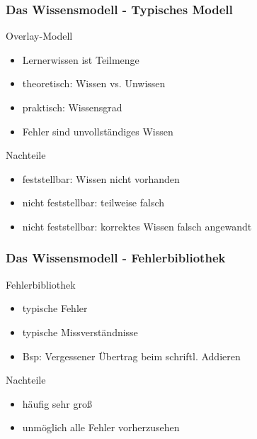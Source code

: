 \documentclass{beamer}
\begin{document}
\begin{frame}
  \frametitle{Das Wissensmodell - Typisches Modell}
  \begin{block}{Overlay-Modell}
    \begin{itemize}
      \item Lernerwissen ist Teilmenge
      \item theoretisch: Wissen vs. Unwissen
      \item praktisch: Wissensgrad
      \item Fehler sind unvollständiges Wissen
    \end{itemize}
  \end{block}

  \begin{alertblock}{Nachteile}
    \begin{itemize}
      \item feststellbar: Wissen nicht vorhanden
      \item nicht feststellbar: teilweise falsch
      \item nicht feststellbar: korrektes Wissen falsch angewandt
    \end{itemize}
  \end{alertblock}
\end{frame}

\begin{frame}
  \frametitle{Das Wissensmodell - Fehlerbibliothek}
  \begin{block}{Fehlerbibliothek}
    \begin{itemize}
      \item typische Fehler
      \item typische Missverständnisse
      \item Bsp: Vergessener Übertrag beim schriftl. Addieren
    \end{itemize}
  \end{block}

  \begin{alertblock}{Nachteile}
    \begin{itemize}
      \item häufig sehr groß
      \item unmöglich alle Fehler vorherzusehen
    \end{itemize}
  \end{alertblock}
\end{frame}
\end{document}
